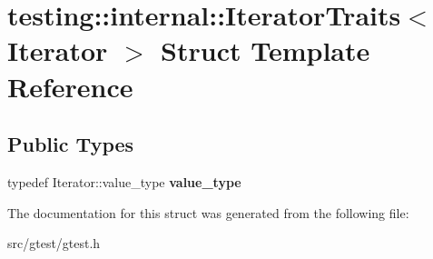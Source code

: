 \hypertarget{structtesting_1_1internal_1_1_iterator_traits}{}\section{testing\+:\+:internal\+:\+:Iterator\+Traits$<$ Iterator $>$ Struct Template Reference}
\label{structtesting_1_1internal_1_1_iterator_traits}
\subsection*{Public Types}
\begin{DoxyCompactItemize}
\item 
\mbox{\label{structtesting_1_1internal_1_1_iterator_traits_a29de4320a9c53ce438d3561b94e515bb}} 
typedef Iterator\+::value\+\_\+type {\bfseries value\+\_\+type}
\end{DoxyCompactItemize}


The documentation for this struct was generated from the following file\+:\begin{DoxyCompactItemize}
\item 
src/gtest/gtest.\+h\end{DoxyCompactItemize}
